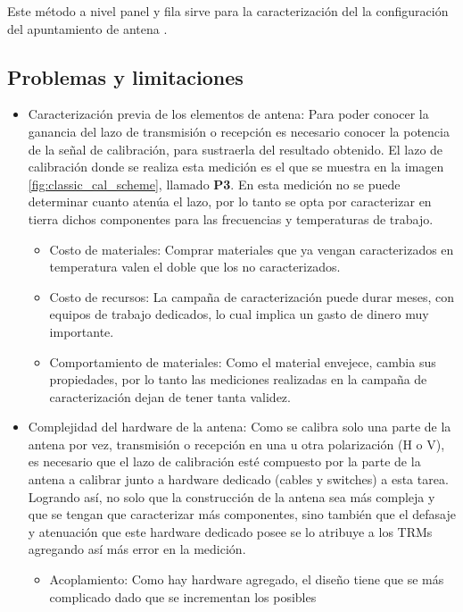 Este método a nivel panel y fila sirve para la caracterización del la configuración del apuntamiento de antena \cite{Br2007}.

\subsection{Problemas y limitaciones}

\begin{itemize}
	\item Caracterización previa de los elementos de antena: Para poder conocer la ganancia del lazo de transmisión o recepción
es necesario conocer la potencia de la señal de calibración, para sustraerla del resultado obtenido. El lazo de calibración 
donde se realiza esta medición es el que se muestra en la imagen \ref{fig:classic_cal_scheme}, llamado \textbf{P3}. En esta 
medición no se puede determinar cuanto atenúa el lazo, por lo tanto se opta por caracterizar en tierra dichos componentes 
para las frecuencias y temperaturas de trabajo. 
	\begin{itemize}
		\item Costo de materiales: Comprar materiales que ya vengan caracterizados en temperatura valen el doble que los no 
			caracterizados.
		\item Costo de recursos: La campaña de caracterización puede durar meses, con equipos de trabajo dedicados, lo cual implica
			un gasto de dinero muy importante. 
		\item Comportamiento de materiales: Como el material envejece, cambia sus propiedades, por lo tanto las mediciones realizadas 
			en la campaña de caracterización dejan de tener tanta validez.
	\end{itemize}
	\item Complejidad del hardware de la antena: Como se calibra solo una parte de la antena por vez, transmisión o recepción en 
		una u otra polarización (H o V), es necesario que el lazo de calibración esté compuesto por la parte de la antena a 
		calibrar junto a hardware dedicado (cables y switches) a esta tarea. Logrando así, no solo que la construcción de la antena 
		sea más compleja y que se tengan que caracterizar más componentes, sino también que el defasaje y atenuación que este 
		hardware dedicado posee se lo atribuye a los TRMs agregando así más error en la medición. 
	\begin{itemize}
		\item Acoplamiento: Como hay hardware agregado, el diseño tiene que se más complicado dado que se incrementan los posibles 

\end{itemize}
\end{itemize}

